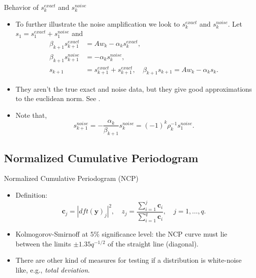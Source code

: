 \documentclass{beamer}
\begin{document}
\begin{frame}{Behavior of $s_{k}^{exact}$ and $s_{k}^{noise}$}
  \begin{itemize}
    \item To further illustrate the noise amplification we look to
      $s_{k}^{exact}$ and $s_{k}^{noise}$. Let $s_{1} = s_{1}^{exact} + 
      s_{1}^{noise}$ and
      \begin{align*}
	\beta_{k+1}s_{k+1}^{exact} &= Aw_{k} - \alpha_{k}s_{k}^{exact}, \\
	\beta_{k+1}s_{k+1}^{noise} &= -\alpha_{k}s_{k}^{noise}, \\
	s_{k+1} &= s_{k+1}^{exact} + s_{k+1}^{exact}, \quad 
	\beta_{k+1}s_{k+1} = Aw_{k} - \alpha_{k}s_{k}.
      \end{align*}
      
    \item They aren't the true exact and noise data, but they give good
      approximations to the euclidean norm. See \cite{bidiagonalization}.

    \item Note that,
      \begin{equation*}
	s_{k+1}^{noise} = -\frac{\alpha_{k}}{\beta_{k+1}}s_{k}^{noise} =
	(-1)^{k}\rho_{k}^{-1}s_{1}^{noise}.
      \end{equation*}
  \end{itemize}
\end{frame}

\subsection{Normalized Cumulative Periodogram}
\begin{frame}{Normalized Cumulative Periodogram (NCP)}
  \begin{itemize}
    \item Definition:
      \begin{equation*}
	\mathbf{c}_{j} = |dft(\mathbf{y})_{j}|^{2}, \quad z_{j} =
	\frac{\sum_{i=1}^{j}\mathbf{c}_{i}}{\sum_{i=1}^{q}\mathbf{c}_{i}},
	\quad j = 1,\ldots,q.
      \end{equation*}

    \item Kolmogorov-Smirnoff at $5\%$ significance level: the NCP curve must
      lie between the limits $\pm 1.35q^{-1/2}$ of the straight line (diagonal).

    \item There are other kind of measures for testing if a distribution is
      white-noise like, e.g., \emph{total deviation}.
    \end{itemize}
\end{frame}
\end{document}
